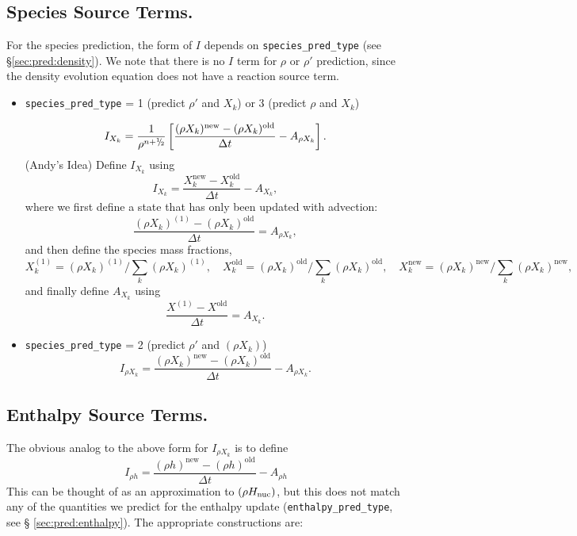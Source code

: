 \subsection{Species Source Terms.}
For the species prediction, the form of $I$ depends on
{\tt species\_pred\_type} (see \S \ref{sec:pred:density}).
We note that there is no $I$ term for $\rho$ or $\rho'$ prediction, since
the density evolution equation does not have a reaction source term.
\begin{itemize}
\item {\tt species\_pred\_type} = 1 (predict $\rho'$ and $X_k$) 
or 3 (predict $\rho$ and $X_k$)

\begin{equation}
I_{X_k} = \frac{1}{\rho^{n+\myhalf}} \left [ 
      \frac{(\rho X_k)^\mathrm{new} - 
            (\rho X_k)^\mathrm{old}}{\Delta t} - A_{\rho X_k}  \right ].
\end{equation}
(Andy's Idea) Define $I_{X_k}$ using
\begin{equation}
I_{X_k} = \frac{X_k^\mathrm{new} - X_k^\mathrm{old}}{\Delta t} - A_{X_k},
\end{equation}
where we first define a state that has only been updated with advection:
\begin{equation}
\frac{(\rho X_k)^{(1)} - (\rho X_k)^\mathrm{old}}{\Delta t} = A_{\rho X_k},
\end{equation}
and then define the species mass fractions,
\begin{equation}
X_k^{(1)} = (\rho X_k)^{(1)} / \sum_k (\rho X_k)^{(1)}, \quad 
X_k^\mathrm{old} = (\rho X_k)^\mathrm{old} / \sum_k (\rho X_k)^\mathrm{old}, \quad 
X_k^\mathrm{new} = (\rho X_k)^\mathrm{new} / \sum_k (\rho X_k)^\mathrm{new},
\end{equation}
and finally define $A_{X_k}$ using
\begin{equation}
\frac{X^{(1)} - X^\mathrm{old}}{\Delta t}= A_{X_k}.
\end{equation}
\item {\tt species\_pred\_type} = 2 (predict $\rho'$ and $(\rho X_k)$)
\begin{equation}
I_{\rho X_k} = \frac{(\rho X_k)^\mathrm{new} - (\rho X_k)^\mathrm{old}}{\Delta t} - A_{\rho X_k}.
\label{eq:sdc:Irhoo}
\end{equation}
\end{itemize}

\subsection{Enthalpy Source Terms.}
The obvious analog to the above form for $I_{\rho X_k}$ is to define
\begin{equation}
I_{\rho h}  = \frac{(\rho h)^\mathrm{new} - (\rho h)^\mathrm{old}}{\Delta t} - A_{\rho h}
\label{eq:sdc:Irhoh}
\end{equation}
This can be thought of as an approximation to $(\rho {H_{\rm nuc}})$,
but this does not match any of the quantities we predict for the
enthalpy update ({\tt enthalpy\_pred\_type}, see \S
\ref{sec:pred:enthalpy}).  The appropriate constructions
are:

